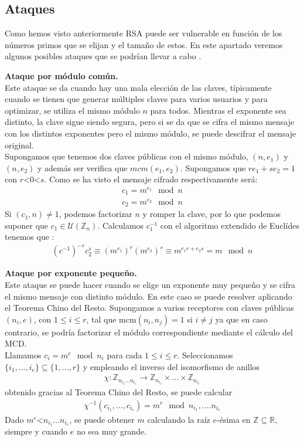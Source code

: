 \subsection{Ataques}
Como hemos visto anteriormente RSA puede ser vulnerable en función de los números primos que se elijan y el tamaño de estos. En este apartado veremos algunos posibles ataques que se podrían llevar a cabo \cite{apuntesCriptografia}.
\begin{description}
	\item \textbf{Ataque por módulo común.}\\
	Este ataque se da cuando hay una mala elección de las claves, típicamente cuando se tienen que generar múltiples claves para varios usuarios y para optimizar, se utiliza el mismo módulo $n$ para todos. Mientras el exponente sea distinto, la clave sigue siendo segura, pero si se da que se cifra el mismo mensaje con los distintos exponentes pero el mismo módulo, se puede descifrar el mensaje original.\\
	Supongamos que tenemos dos claves públicas con el mismo módulo, $(n, e_1)$ y $(n, e_2)$ y además ser verifica que  $mcm(e_1,e_2)$. Supongamos que $re_1+se_2=1$ con $r$\textless $0$\textless $s$. Como se ha visto el mensaje cifrado respectivamente será:
	\begin{align*}
		c_1 = m^{e_1} \mod n\\
		c_2 = m^{e_2} \mod n
	\end{align*}
	Si $(c_1,n) \neq 1$, podemos factorizar $n$ y romper la clave, por lo que podemos suponer que $c_1 \in \mathcal{U}(\mathbb{Z}_n)$. Calculamos $c_1^{-1}$ con el algoritmo extendido de Euclídes tenemos que :
	\begin{align*}
			(c^{-1})^{-r}c_2^s \equiv (m^{e_1})^r(m^{e_2})^s \equiv m^{e_1r+e_2s} = m \mod n
	\end{align*}

	\item \textbf{Ataque por exponente pequeño.}\\
	Este ataque se puede hacer cuando se elige un exponente muy pequeño y se cifra el mismo mensaje con distinto módulo. En este caso se puede resolver aplicando el Teorema Chino del Resto. Supongamos a varios receptores con claves públicas $(n_i, e)$, con $1\leq i \leq r$, tal que mcm$(n_i, n_j) = 1$ si $i\neq j$ ya que en caso contrario, se podría factorizar el módulo correspondiente mediante el cálculo del MCD.\\
	Llamamos $c_i = m^e \mod n_i$ para cada $1\leq i \leq r$. Seleccionamos $\{i_1,...,i_e \}\subseteq \{1,...,r\}$ y empleando el inverso del isomorfismo de anillos
	\begin{align*}
		\chi:\mathbb{Z}_{n_{i_1}...n_{i_e}}\rightarrow \mathbb{Z}_{n_{i_1}}\times ... \times \mathbb{Z}_{n_{i_e}}
	\end{align*}
	obtenido gracias al Teorema Chino del Resto, se puede calcular
	\begin{align*}
		\chi^{-1}(c_{i_1},...,c_{i_e}) = m^e \mod n_{i_1},....n_{i_e}
	\end{align*}
	Dado $m^e$\textless $n_{i_1}...n_{i_e}$, se puede obtener $m$ calculando la raíz $e$-ésima en $\mathbb{Z} \subseteq \mathbb{R}$, siempre y cuando $e$ no sea muy grande.


\end{description}
